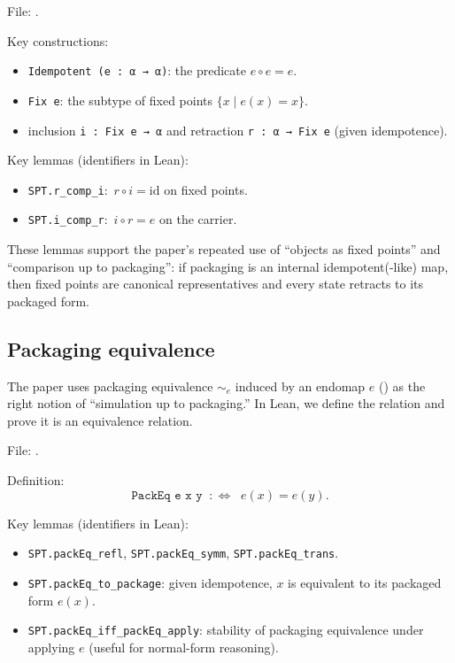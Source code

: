 \documentclass[11pt]{article}
\theoremstyle{definition}
\theoremstyle{remark}
\begin{document}
File: .

Key constructions:
\begin{itemize}[leftmargin=*, itemsep=0.25em]
  \item \texttt{Idempotent (e : α → α)}: the predicate $e\circ e = e$.
  \item \texttt{Fix e}: the subtype of fixed points $\{x \mid e(x)=x\}$.
  \item inclusion \texttt{i : Fix e → α} and retraction \texttt{r : α → Fix e} (given idempotence).
\end{itemize}

Key lemmas (identifiers in Lean):
\begin{itemize}[leftmargin=*, itemsep=0.25em]
  \item \texttt{SPT.r\_comp\_i}: \,$r \circ i = \mathrm{id}$ on fixed points.
  \item \texttt{SPT.i\_comp\_r}: \,$i \circ r = e$ on the carrier.
\end{itemize}

These lemmas support the paper’s repeated use of ``objects as fixed points'' and ``comparison up to packaging'': if packaging is an internal idempotent(-like) map, then fixed points are canonical representatives and every state retracts to its packaged form.

\subsection{Packaging equivalence}

The paper uses packaging equivalence $\sim_e$ induced by an endomap $e$ () as the right notion of ``simulation up to packaging.''
In Lean, we define the relation and prove it is an equivalence relation.

File: .

Definition:
\[
\texttt{PackEq e x y} \;\;:\!\iff\;\; e(x)=e(y).
\]

Key lemmas (identifiers in Lean):
\begin{itemize}[leftmargin=*, itemsep=0.25em]
  \item \texttt{SPT.packEq\_refl}, \texttt{SPT.packEq\_symm}, \texttt{SPT.packEq\_trans}.
  \item \texttt{SPT.packEq\_to\_package}: given idempotence, $x$ is equivalent to its packaged form $e(x)$.
  \item \texttt{SPT.packEq\_iff\_packEq\_apply}: stability of packaging equivalence under applying $e$ (useful for normal-form reasoning).
\end{itemize}
\end{document}
